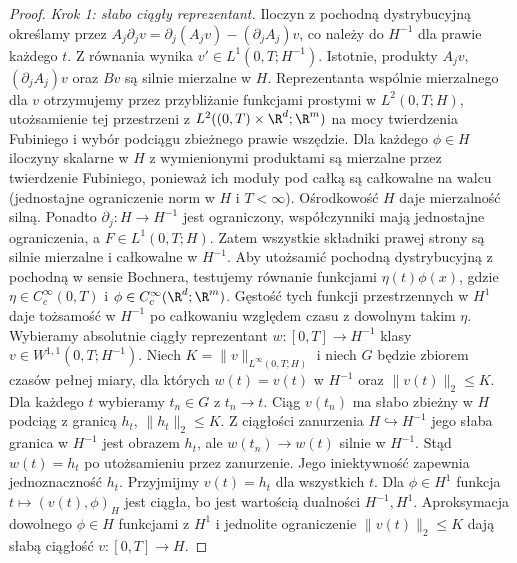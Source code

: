 \begin{proof}
\emph{Krok 1: słabo ciągły reprezentant.}
Iloczyn z pochodną dystrybucyjną określamy przez
$A_j\partial_j v=\partial_j(A_jv)-(\partial_jA_j)v$,
co należy do $H^{-1}$ dla prawie każdego $t$.
Z równania wynika
$v'\in L^1(0,T;H^{-1})$. Istotnie, produkty $A_jv$,
$(\partial_jA_j)v$ oraz $Bv$ są silnie mierzalne
w $H$. Reprezentanta wspólnie mierzalnego dla $v$
otrzymujemy przez przybliżanie funkcjami prostymi
w $L^2(0,T;H)$, utożsamienie tej przestrzeni z
$L^2((0,T)\times\R^d;\R^m)$ na mocy twierdzenia
Fubiniego i wybór podciągu zbieżnego prawie wszędzie.
Dla każdego $\phi\in H$ iloczyny skalarne
w $H$ z wymienionymi produktami są mierzalne
przez twierdzenie Fubiniego, ponieważ ich moduły
pod całką są całkowalne na walcu (jednostajne
ograniczenie norm w $H$ i $T<\infty$).
Ośrodkowość $H$ daje mierzalność silną. Ponadto $\partial_j:H\to H^{-1}$
jest ograniczony, współczynniki mają jednostajne
ograniczenia, a $F\in L^1(0,T;H)$.
Zatem wszystkie składniki prawej strony są
silnie mierzalne i całkowalne w $H^{-1}$.
Aby utożsamić pochodną dystrybucyjną z pochodną
w sensie Bochnera, testujemy równanie funkcjami
$\eta(t)\phi(x)$, gdzie $\eta\in C_c^\infty(0,T)$
i $\phi\in C_c^\infty(\R^d;\R^m)$.
Gęstość tych funkcji przestrzennych w $H^1$
daje tożsamość w $H^{-1}$ po całkowaniu względem
czasu z dowolnym takim $\eta$.
Wybieramy absolutnie ciągły reprezentant
$w:[0,T]\to H^{-1}$ klasy $v\in W^{1,1}(0,T;H^{-1})$.
Niech $K=\|v\|_{L^\infty(0,T;H)}$ i niech $G$
będzie zbiorem czasów pełnej miary, dla których
$w(t)=v(t)$ w $H^{-1}$ oraz $\|v(t)\|_2\le K$.
Dla każdego $t$ wybieramy $t_n\in G$ z $t_n\to t$.
Ciąg $v(t_n)$ ma słabo zbieżny w $H$ podciąg
z granicą $h_t$, $\|h_t\|_2\le K$. Z ciągłości
zanurzenia $H\hookrightarrow H^{-1}$ jego słaba
granica w $H^{-1}$ jest obrazem $h_t$, ale
$w(t_n)\to w(t)$ silnie w $H^{-1}$.
Stąd $w(t)=h_t$ po utożsamieniu przez zanurzenie.
Jego iniektywność zapewnia jednoznaczność $h_t$.
Przyjmijmy $v(t)=h_t$ dla wszystkich $t$.
Dla $\phi\in H^1$ funkcja $t\mapsto(v(t),\phi)_H$
jest ciągła, bo jest wartością dualności $H^{-1},H^1$.
Aproksymacja dowolnego $\phi\in H$ funkcjami z $H^1$
i jednolite ograniczenie $\|v(t)\|_2\le K$ dają
słabą ciągłość $v:[0,T]\to H$.


\end{proof}
